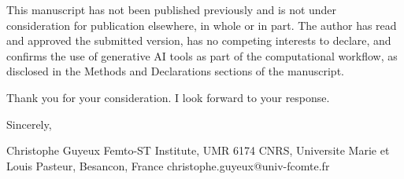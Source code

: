 \documentclass[11pt,a4paper]{article}
\begin{document}
This manuscript has not been published previously and is not under consideration for publication elsewhere, in whole or in part. The author has read and approved the submitted version, has no competing interests to declare, and confirms the use of generative AI tools as part of the computational workflow, as disclosed in the Methods and Declarations sections of the manuscript.

Thank you for your consideration. I look forward to your response.

Sincerely,

Christophe Guyeux Femto-ST Institute, UMR 6174 CNRS, Universite Marie et Louis Pasteur, Besancon, France christophe.guyeux@univ-fcomte.fr
\end{document}
